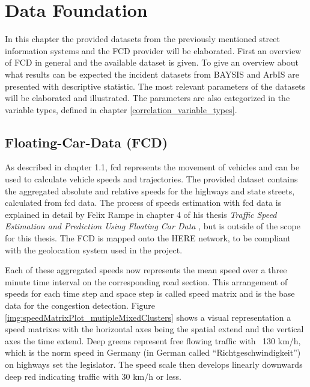 \chapter{Data Foundation}
\label{data}
In this chapter the provided datasets from the previously mentioned street information systems and the FCD provider will be elaborated. First an overview of FCD in general and the available dataset is given. To give an overview about what results can be expected the incident datasets from BAYSIS and ArbIS are presented with descriptive statistic. The most relevant parameters of the datasets will be elaborated and illustrated. The parameters are also categorized in the variable types, defined in chapter \autoref{correlation_variable_types}.

\section{Floating-Car-Data (FCD)}
\label{dataset_fcd}
 
As described in chapter 1.1, \acrshort{fcd} represents the movement of vehicles and can be used to calculate vehicle speeds and trajectories. The provided dataset contains the aggregated absolute and relative speeds for the highways and state streets, calculated from \acrshort{fcd} data. The process of speeds estimation with \acrshort{fcd} data is explained in detail by Felix Rampe in chapter 4 of his thesis \textit{Traffic Speed Estimation and Prediction Using Floating Car Data} \parencite{Rempe2018}, but is outside of the scope for this thesis. The FCD is mapped onto the HERE \parencite{HERE2020} network, to be compliant with the geolocation system used in the project.


Each of these aggregated speeds now represents the mean speed over a three minute time interval on the corresponding road section. This arrangement of speeds for each time step and space step is called speed matrix and is the base data for the congestion detection. Figure \autoref{img:speedMatrixPlot_mutipleMixedClusters} shows a visual representation a speed matrixes with the horizontal axes being the spatial extend and the vertical axes the time extend. Deep greens represent free flowing traffic with ~130 km/h, which is the norm speed in Germany (in German called “Richtgeschwindigkeit”) on highways set the legislator. The speed scale then develops linearly downwards deep red indicating traffic with 30 km/h or less. 

